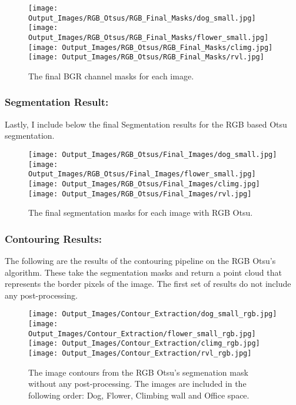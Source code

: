 \documentclass{article}
\begin{document}
\begin{figure}[H]
    \centering
    \texttt{[image: Output\_Images/RGB\_Otsus/RGB\_Final\_Masks/dog\_small.jpg]}
    \texttt{[image: Output\_Images/RGB\_Otsus/RGB\_Final\_Masks/flower\_small.jpg]}
    \texttt{[image: Output\_Images/RGB\_Otsus/RGB\_Final\_Masks/climg.jpg]}
    \texttt{[image: Output\_Images/RGB\_Otsus/RGB\_Final\_Masks/rvl.jpg]}
    \caption{The final BGR channel masks for each image.}
\end{figure}

\subsubsection{Segmentation Result:}
Lastly, I include below the final Segmentation results for the RGB based Otsu segmentation.

\begin{figure}[H]
    \centering
    \texttt{[image: Output\_Images/RGB\_Otsus/Final\_Images/dog\_small.jpg]}
    \texttt{[image: Output\_Images/RGB\_Otsus/Final\_Images/flower\_small.jpg]}
    \texttt{[image: Output\_Images/RGB\_Otsus/Final\_Images/climg.jpg]}
    \texttt{[image: Output\_Images/RGB\_Otsus/Final\_Images/rvl.jpg]}
    \caption{The final segmentation masks for each image with RGB Otsu.}
\end{figure}

\subsubsection{Contouring Results:}
The following are the results of the contouring pipeline on the RGB Otsu's algorithm. These take the segmentation masks
and return a point cloud that represents the border pixels of the image. The first set of results do not include any post-processing.
\begin{figure}[H]
    \centering
    \texttt{[image: Output\_Images/Contour\_Extraction/dog\_small\_rgb.jpg]}
    \texttt{[image: Output\_Images/Contour\_Extraction/flower\_small\_rgb.jpg]}
    \texttt{[image: Output\_Images/Contour\_Extraction/climg\_rgb.jpg]}
    \texttt{[image: Output\_Images/Contour\_Extraction/rvl\_rgb.jpg]}
    \caption{The image contours from the RGB Otsu's segmenation mask without any post-processing. The images are included in the following order:
    Dog, Flower, Climbing wall and Office space.}
\end{figure}
\end{document}
